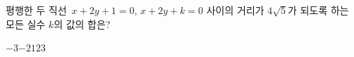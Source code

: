 평행한 두 직선~$x+2y+1=0$, $x+2y+k=0$ 사이의 거리가 $4\sqrt{5}$가 되도록 하는 모든 실수 $k$의 값의 합은?
\begin{choices32}{$-3$}{$-2$}{$1$}{$2$}{$3$}\end{choices32}
